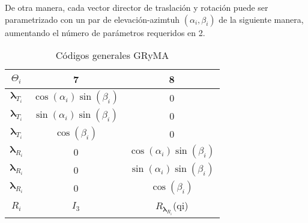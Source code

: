         De otra manera, cada vector director de traslación y rotación puede ser parametrizado 
        con un par de elevación-azimtuh $(\alpha_i,\beta_i)$ de la siguiente manera, 
        aumentando el número de parámetros requeridos en 2. 
        \begin{table}[H]
            \caption{Códigos generales GRyMA}
            \centering
            \begin{center}
                \begin{tabular}{ccc}
                    $\Theta_i$ & 7 & 8\\
                    \hline \hline 
                    $\boldsymbol{\lambda}_{T_i}$ & $\cos{(\alpha_i)}\sin{(\beta_i)}$ & 0\\ 
                    $\boldsymbol{\lambda}_{T_i}$ & $\sin{(\alpha_i)}\sin{(\beta_i)}$ & 0\\
                    $\boldsymbol{\lambda}_{T_i}$ & $\cos{(\beta_i)}$ & 0\\
                    \hline 
                    $\boldsymbol{\lambda}_{R_i}$ & 0 & $\cos{(\alpha_i)}\sin{(\beta_i)}$\\
                    $\boldsymbol{\lambda}_{R_i}$ & 0 & $\sin{(\alpha_i)}\sin{(\beta_i)}$\\
                    $\boldsymbol{\lambda}_{R_i}$ & 0 & $\cos{(\beta_i)}$\\
                    \hline 
                    $R_{i}$ & $I_3$ & $R_{\boldsymbol{\lambda}_{R_i}}$(qi)\\ 
                \end{tabular}
            \end{center}
        \end{table}
